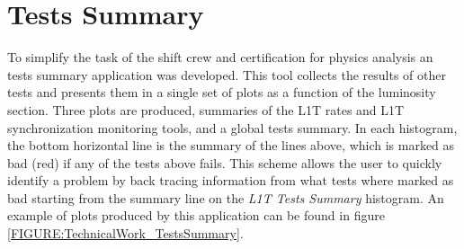 \section{Tests Summary}


To simplify the task of the shift crew and certification for physics analysis an tests summary application was developed. This tool collects the results of other tests and presents them in a single set of plots as a function of the luminosity section. Three plots are produced, summaries of the \gls{L1T} rates and \gls{L1T} synchronization monitoring tools, and a global tests summary. In each histogram, the bottom horizontal line is the summary of the lines above, which is marked as bad (red) if any of the tests above fails. This scheme allows the user to quickly identify a problem by back tracing information from what tests where marked as bad starting from the summary line on the \textit{L1T Tests Summary} histogram. An example of plots produced by this application can be found in figure \ref{FIGURE:TechnicalWork_TestsSummary}.

